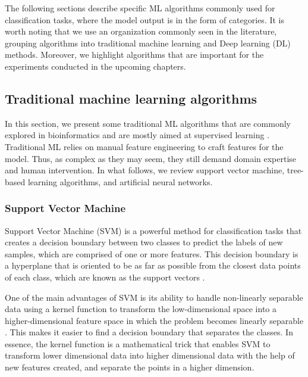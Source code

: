 The following sections describe specific ML algorithms commonly used for classification tasks, where the model output is in the form of categories. It is worth noting that we use an organization commonly seen in the literature, grouping algorithms into traditional machine learning and Deep learning (DL) methods. 
Moreover, we highlight algorithms that are important for the experiments conducted in the upcoming chapters.



\subsection{Traditional machine learning algorithms}
\label{sec:comp_concepts:tradml}


In this section, we present some traditional ML algorithms that are commonly explored in bioinformatics and are mostly aimed at supervised learning \cite{Kotsiantis2006}. Traditional ML relies on manual feature engineering to craft features for the model. Thus, as complex as they may seem, they still demand domain expertise and human intervention. In what follows, we review support vector machine, tree-based learning algorithms, and artificial neural networks.



\subsubsection{Support Vector Machine} 

Support Vector Machine (SVM) is a powerful method for classification tasks that creates a decision boundary between two classes to predict the labels of new samples, which are comprised of one or more features. This decision boundary is a hyperplane that is oriented to be as far as possible from the closest data points of each class, which are known as the support vectors \cite{huang2018applications}.

One of the main advantages of SVM is its ability to handle non-linearly separable data using a kernel function to transform the low-dimensional space into a higher-dimensional feature space in which the problem becomes linearly separable \cite{mammone2009support}. This makes it easier to find a decision boundary that separates the classes. In essence, the kernel function is a mathematical trick that enables SVM to transform lower dimensional data into higher dimensional data with the help of new features created, and separate the points in a higher dimension. 

